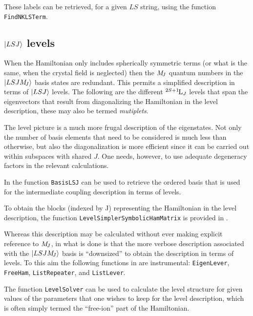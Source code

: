 \documentclass{article}
\newcommand{\codetext}[1]{{\color{BlueViolet} \texttt{#1}}}
\begin{document}
These labels can be retrieved, for a given $LS$ string, using the function \codetext{FindNKLSTerm}.

 


\subsection{$|LSJ\rangle$ levels}

When the Hamiltonian only includes spherically symmetric terms (or what is the same, when the crystal field is neglected) then the $M_{\!{J}}$ quantum numbers in the $|LSJM_{\!{J}}\rangle$ basis states are redundant. This permits a simplified description  in terms of $|LSJ\rangle$ levels. The following are the different ${}^{2S+1}{\kern-0.1em}{\text{L}}_{J}$ levels that span the eigenvectors that result from diagonalizing the Hamiltonian in the level description, these may also be termed \textit{mutiplets}.



The level picture is a much more frugal description of the eigenstates. Not only the number of basis elements that need to be considered is much less than otherwise, but also the diagonalization is more efficient since it can be carried out within subspaces with shared $J$. One needs, however, to use adequate degeneracy factors in the relevant calculations.

In \qlanth the function \codetext{BasisLSJ} can be used to retrieve the ordered basis that is used for the intermediate coupling description in terms of levels.



To obtain the blocks (indexed by J) representing the Hamiltonian in the level description, the function \codetext{LevelSimplerSymbolicHamMatrix} is provided in \qlanth.

 

Whereas this description may be calculated without ever making explicit reference to $M_{\!{J}}$, in \qlanth what is done is that the more verbose description associated with the $|LSJM_{\!{J}}\rangle$ basis is ``downsized'' to obtain the description in terms of levels. To this aim the following functions in \qlanth are instrumental: \codetext{EigenLever}, \codetext{FreeHam}, \codetext{ListRepeater}, and \codetext{ListLever}.

The function \codetext{LevelSolver} can be used to calculate the level structure for given values of the parameters that one wishes to keep for the level description, which is often simply termed the ``free-ion'' part of the Hamiltonian.
\end{document}
